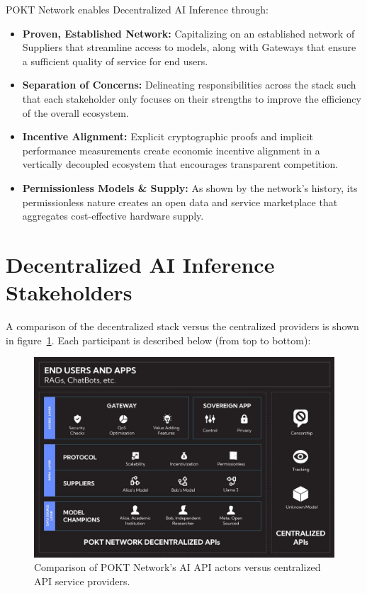 \documentclass[conference,compsoc]{IEEEtran}
\begin{document}
POKT Network enables Decentralized AI Inference through:
\begin{itemize}
    \item \textbf{Proven, Established Network:} Capitalizing on an established network of Suppliers that streamline access to models, along with Gateways that ensure a sufficient quality of service for end users.
    \item \textbf{Separation of Concerns:} Delineating responsibilities across the stack such that each stakeholder only focuses on their strengths to improve the efficiency of the overall ecosystem.
    \item \textbf{Incentive Alignment:} Explicit cryptographic proofs and implicit performance measurements create economic incentive alignment in a vertically decoupled ecosystem that encourages transparent competition.
    \item \textbf{Permissionless Models \& Supply:} As shown by the network’s history, its permissionless nature creates an open data and service marketplace that aggregates cost-effective hardware supply.
\end{itemize}


\section{Decentralized AI Inference Stakeholders}

A comparison of the decentralized stack versus the centralized providers is shown in figure~\ref{fig_stakeholders}. Each participant is described below (from top to bottom):

\begin{figure}[!h]
\centering
\includegraphics[width=0.9\linewidth]{stakeholders.jpeg}
\caption{Comparison of POKT Network's AI API actors versus centralized API service providers.}
\label{fig_stakeholders}
\end{figure}
\end{document}

